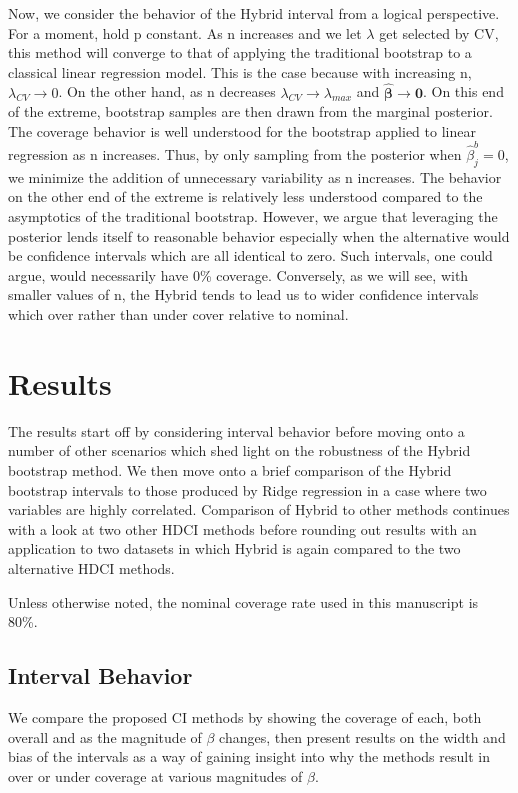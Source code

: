Now, we consider the behavior of the Hybrid interval from a logical perspective. For a moment, hold p constant. As n increases and we let $\lambda$ get selected by CV, this method will converge to that of applying the traditional bootstrap to a classical linear regression model. This is the case because with increasing n, $\lambda_{CV} \rightarrow 0$. On the other hand, as n decreases $\lambda_{CV} \rightarrow \lambda_{max}$ and $\hat{\boldsymbol{\beta}}\rightarrow \boldsymbol{0}$. On this end of the extreme, bootstrap samples are then drawn from the marginal posterior. The coverage behavior is well understood for the bootstrap applied to linear regression as n increases. Thus, by only sampling from the posterior when $\hat{\beta}_j^b = 0$, we minimize the addition of unnecessary variability as n increases. The behavior on the other end of the extreme is relatively less understood compared to the asymptotics of the traditional bootstrap. However, we argue that leveraging the posterior lends itself to reasonable behavior especially when the alternative would be confidence intervals which are all identical to zero. Such intervals, one could argue, would necessarily have 0\% coverage. Conversely, as we will see, with smaller values of n, the Hybrid tends to lead us to wider confidence intervals which over rather than under cover relative to nominal.

\section{Results}

The results start off by considering interval behavior before moving onto a number of other scenarios which shed light on the robustness of the Hybrid bootstrap method. We then move onto a brief comparison of the Hybrid bootstrap intervals to those produced by Ridge regression in a case where two variables are highly correlated. Comparison of Hybrid to other methods continues with a look at two other HDCI methods before rounding out results with an application to two datasets in which Hybrid is again compared to the two alternative HDCI methods.

Unless otherwise noted, the nominal coverage rate used in this manuscript is 80\%.

\subsection{Interval Behavior}

We compare the proposed CI methods by showing the coverage of each, both overall and as the magnitude of $\beta$ changes, then present results on the width and bias of the intervals as a way of gaining insight into why the methods result in over or under coverage at various magnitudes of $\beta$.

